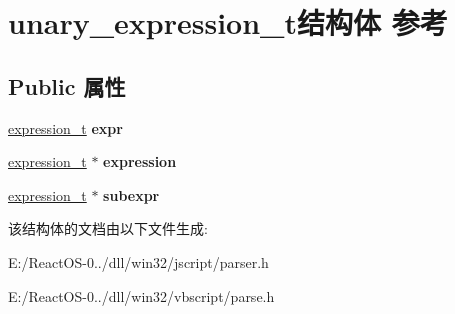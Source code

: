 \hypertarget{structunary__expression__t}{}\section{unary\+\_\+expression\+\_\+t结构体 参考}
\label{structunary__expression__t}
\subsection*{Public 属性}
\begin{DoxyCompactItemize}
\item 
\mbox{\label{structunary__expression__t_a3d6f6618192ed6e1cfe57e7cb888e9c5}} 
\hyperlink{struct__expression__t}{expression\+\_\+t} {\bfseries expr}
\item 
\mbox{\label{structunary__expression__t_a188f1f9511f53ecef96964cf2239a8fe}} 
\hyperlink{struct__expression__t}{expression\+\_\+t} $\ast$ {\bfseries expression}
\item 
\mbox{\label{structunary__expression__t_ab9d3d51231549bc801e2660b9e442ab8}} 
\hyperlink{struct__expression__t}{expression\+\_\+t} $\ast$ {\bfseries subexpr}
\end{DoxyCompactItemize}


该结构体的文档由以下文件生成\+:\begin{DoxyCompactItemize}
\item 
E\+:/\+React\+O\+S-\/0../dll/win32/jscript/parser.\+h\item 
E\+:/\+React\+O\+S-\/0../dll/win32/vbscript/parse.\+h\end{DoxyCompactItemize}
